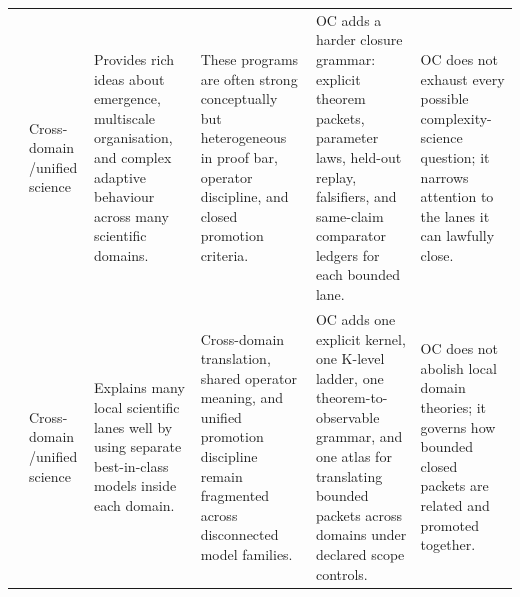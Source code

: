 \begin{longtable}{@{}L{0.17\textwidth}L{0.09\textwidth}L{0.17\textwidth}L{0.17\textwidth}L{0.20\textwidth}L{0.14\textwidth}@{}}
 & Cross-domain /\allowbreak unified science & Provides rich ideas about emergence, multiscale organisation, and complex adaptive behaviour across many scientific domains. & These programs are often strong conceptually but heterogeneous in proof bar, operator discipline, and closed promotion criteria. & OC adds a harder closure grammar: explicit theorem packets, parameter laws, held-out replay, falsifiers, and same-claim comparator ledgers for each bounded lane. & OC does not exhaust every possible complexity-science question; it narrows attention to the lanes it can lawfully close. \\
 & Cross-domain /\allowbreak unified science & Explains many local scientific lanes well by using separate best-in-class models inside each domain. & Cross-domain translation, shared operator meaning, and unified promotion discipline remain fragmented across disconnected model families. & OC adds one explicit kernel, one K-level ladder, one theorem-to-observable grammar, and one atlas for translating bounded packets across domains under declared scope controls. & OC does not abolish local domain theories; it governs how bounded closed packets are related and promoted together. \\
\bottomrule
\end{longtable}
\endgroup

